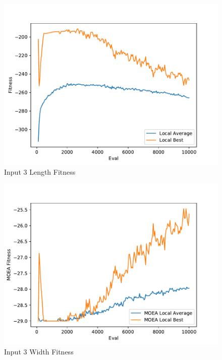 \documentclass{standalone}
\begin{document}
\begin{figure}[!htb]
	\caption{Input 3 Length Fitness}
	\label{fig:graph_3005}
	\includegraphics[width=\textwidth]{../graphs/graphs/3005.pdf}
\end{figure}


\begin{figure}[!htb]
	\caption{Input 3 Width Fitness}
	\label{fig:graph_3005_moea}
	\includegraphics[width=\textwidth]{../graphs/graphs/3005_moea.pdf}
\end{figure}
\end{document}
